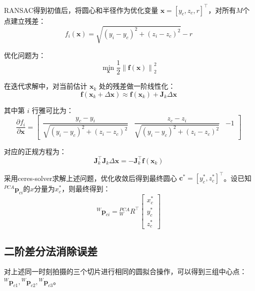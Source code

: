 \documentclass{article}
\begin{document}
RANSAC得到初值后，将圆心和半径作为优化变量 $\mathbf{x} = [y_c, z_c, r]^\top$，对所有$M$个点建立残差：
\begin{equation}
    f_i(\mathbf{x}) = \sqrt{(y_i - y_c)^2 + (z_i - z_c)^2} - r
\end{equation}

优化问题为：
\begin{equation}
    \min_{\mathbf{x}} \frac{1}{2} \left\| \mathbf{f}(\mathbf{x}) \right\|_2^2
\end{equation}

在迭代求解中，对当前估计 $\mathbf{x}_k$ 处的残差做一阶线性化：
\begin{equation}
    \mathbf{f}(\mathbf{x}_k + \Delta \mathbf{x}) \approx \mathbf{f}(\mathbf{x}_k) + \mathbf{J}_k \Delta \mathbf{x}
\end{equation}

其中第 $i$ 行雅可比为：
\begin{equation}
    \frac{\partial f_i}{\partial \mathbf{x}} =
    \begin{bmatrix}
    \dfrac{y_c - y_i}{\sqrt{(y_i - y_c)^2 + (z_i - z_c)^2}} &
    \dfrac{z_c - z_i}{\sqrt{(y_i - y_c)^2 + (z_i - z_c)^2}} &
    -1
    \end{bmatrix}
\end{equation}

对应的正规方程为：
\begin{equation}
    \mathbf{J}_k^{\top} \mathbf{J}_k \Delta \mathbf{x} = -\mathbf{J}_k^{\top} \mathbf{f}(\mathbf{x}_k)
\end{equation}

采用ceres-solver求解上述问题，优化收敛后得到最终圆心 $\mathbf{c}^{*} = [y_c^{*}, z_c^{*}]^\top$。设已知${}^{PCA}\mathbf{p}_{ci}$的$x$分量为$x_c^*$，则最终得到：
\begin{equation}
    {}^W\mathbf{p}_{ci} = {}^{PCA}_W R^\top
    \begin{bmatrix} x_c^* \\ y_c^* \\ z_c^* \end{bmatrix}
\end{equation}

\subsection{二阶差分法消除误差}

对上述同一时刻拍摄的三个切片进行相同的圆拟合操作，可以得到三组中心点：${}^W\mathbf{p}_{c1}, {}^W\mathbf{p}_{c2}, {}^W\mathbf{p}_{c3}$。
\end{document}
